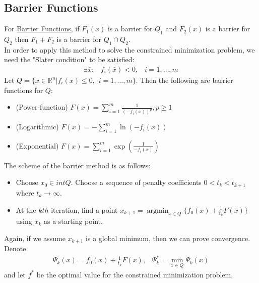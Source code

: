 \documentclass[12pt,a4paper]{article}
\DeclareMathOperator*{\argmin}{argmin}
\begin{document}
	\subsection*{Barrier Functions}
	For \hyperref[sec:Def]{Barrier Functions}, if $F_1(x)$ is a barrier for $Q_1$ and $F_2(x)$ is a barrier for $Q_2$ then $F_1 + F_2$ is a barrier for $Q_1 \cap Q_2$.\\
	In order to apply this method to solve the constrained minimization problem, we need the "Slater condition" to be satisfied:
	\begin{align*}
		\exists \bar{x}: \hspace{10pt} f_i(\bar{x}) < 0, \hspace{10pt} i=1, \ldots , m
	\end{align*}
	Let $Q = \{x \in \mathbb{R}^n | f_i(x) \leq 0, \hspace{5pt} i = 1, \ldots , m\}$. Then the following are barrier functions for $Q$:
	\begin{itemize}
		\item (Power-function) $F(x) = \sum_{i=1}^{m}\frac{1}{(-f_i(x))^p}, p\geq 1$
		\item (Logarithmic) $F(x) = - \sum_{i=1}^{m}\ln(-f_i(x))$
		\item (Exponential) $F(x) = \sum_{i=1}^{m}\exp(\frac{1}{-f_i(x)})$
	\end{itemize}
	The scheme of the barrier method is as follows:
	\begin{itemize}
		\item Choose $x_0 \in int Q$. Choose a sequence of penalty coefficients $0 < t_k < t_{k+1}$ where $t_k \rightarrow \infty$.
		\item At the $kth$ iteration, find a point $x_{k+1} = \argmin_{x \in Q}\{f_0(x) + \frac{1}{t_k}F(x)\}$ using $x_k$ as a starting point.
	\end{itemize}
	Again, if we assume $x_{k+1}$ is a global minimum, then we can prove convergence.\\
	Denote 
	\begin{align*}
		\Psi_k(x) = f_0(x) + \frac{1}{t_k}F(x), \hspace{10pt} \Psi_k^* = \min_{x \in Q}\Psi_k(x)
	\end{align*}
	and let $f^*$ be the optimal value for the constrained minimization problem.
\end{document}
